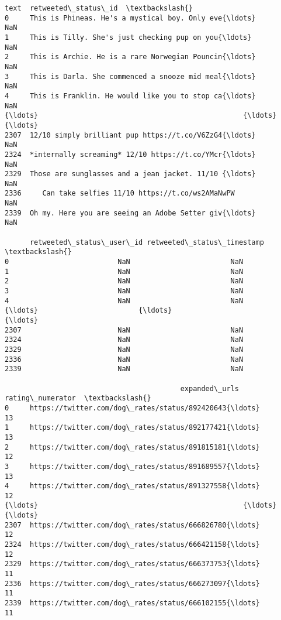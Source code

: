 \documentclass[11pt]{article}
\begin{document}
\begin{tcolorbox}[breakable, size=fbox, boxrule=.5pt, pad at break*=1mm, opacityfill=0]
\begin{Verbatim}[commandchars=\\\{\}]
                                                   text  retweeted\_status\_id  \textbackslash{}
0     This is Phineas. He's a mystical boy. Only eve{\ldots}                  NaN
1     This is Tilly. She's just checking pup on you{\ldots}                  NaN
2     This is Archie. He is a rare Norwegian Pouncin{\ldots}                  NaN
3     This is Darla. She commenced a snooze mid meal{\ldots}                  NaN
4     This is Franklin. He would like you to stop ca{\ldots}                  NaN
{\ldots}                                                 {\ldots}                  {\ldots}
2307  12/10 simply brilliant pup https://t.co/V6ZzG4{\ldots}                  NaN
2324  *internally screaming* 12/10 https://t.co/YMcr{\ldots}                  NaN
2329  Those are sunglasses and a jean jacket. 11/10 {\ldots}                  NaN
2336     Can take selfies 11/10 https://t.co/ws2AMaNwPW                  NaN
2339  Oh my. Here you are seeing an Adobe Setter giv{\ldots}                  NaN

      retweeted\_status\_user\_id retweeted\_status\_timestamp  \textbackslash{}
0                          NaN                        NaN
1                          NaN                        NaN
2                          NaN                        NaN
3                          NaN                        NaN
4                          NaN                        NaN
{\ldots}                        {\ldots}                        {\ldots}
2307                       NaN                        NaN
2324                       NaN                        NaN
2329                       NaN                        NaN
2336                       NaN                        NaN
2339                       NaN                        NaN

                                          expanded\_urls  rating\_numerator  \textbackslash{}
0     https://twitter.com/dog\_rates/status/892420643{\ldots}                13
1     https://twitter.com/dog\_rates/status/892177421{\ldots}                13
2     https://twitter.com/dog\_rates/status/891815181{\ldots}                12
3     https://twitter.com/dog\_rates/status/891689557{\ldots}                13
4     https://twitter.com/dog\_rates/status/891327558{\ldots}                12
{\ldots}                                                 {\ldots}               {\ldots}
2307  https://twitter.com/dog\_rates/status/666826780{\ldots}                12
2324  https://twitter.com/dog\_rates/status/666421158{\ldots}                12
2329  https://twitter.com/dog\_rates/status/666373753{\ldots}                11
2336  https://twitter.com/dog\_rates/status/666273097{\ldots}                11
2339  https://twitter.com/dog\_rates/status/666102155{\ldots}                11


\end{Verbatim}
\end{tcolorbox}
\end{document}
